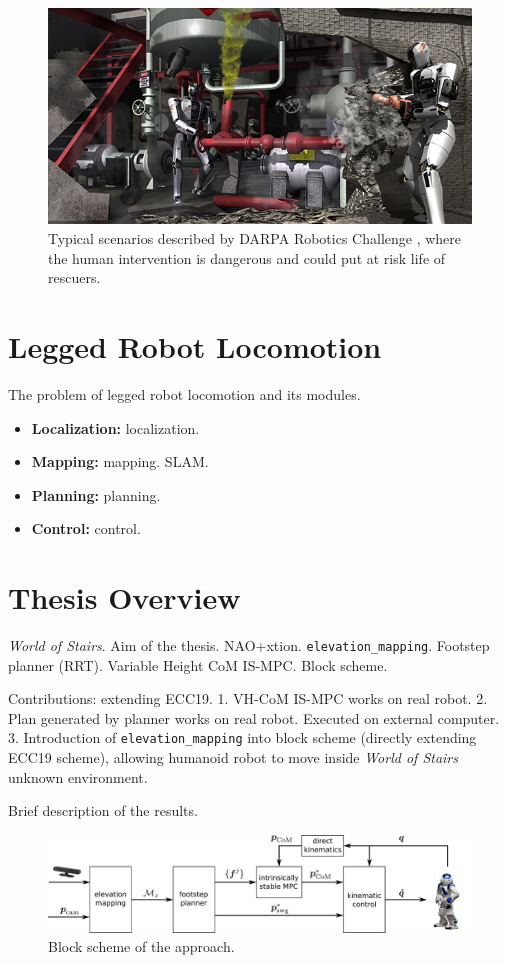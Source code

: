 \begin{figure}
  \centering
  \includegraphics[width=\textwidth]{figures/DARPARoboticsChallenge.jpg}
  \caption{Typical scenarios described by DARPA Robotics Challenge
      \cite{Atkenson2018DARPARoboticsChallengeFinals}, where the human 
      intervention is dangerous and could put at risk life of rescuers.}
  \label{fig:drc}
\end{figure}

\section{Legged Robot Locomotion}
The problem of legged robot locomotion and its modules.

\begin{itemize}
  \item \textbf{Localization:} localization.
  \item \textbf{Mapping:} mapping. SLAM.
  \item \textbf{Planning:} planning.
  \item \textbf{Control:} control.
\end{itemize}

\section{Thesis Overview}
\textit{World of Stairs}. Aim of the thesis. NAO+xtion.
\texttt{elevation\_mapping}. Footstep planner (RRT).
Variable Height CoM IS-MPC. Block scheme.

Contributions: extending ECC19.
1. VH-CoM IS-MPC works on real robot.
2. Plan generated by planner works on real robot. Executed on external computer.
3. Introduction of \texttt{elevation\_mapping} into block scheme (directly
extending ECC19 scheme), allowing humanoid robot to move inside
\textit{World of Stairs} unknown environment.

Brief description of the results.

\begin{figure}
  \centering
  \includegraphics[width=\textwidth]{figures/BlockScheme.pdf}
  \caption{Block scheme of the approach.}
  \label{fig:block-scheme}
\end{figure}

